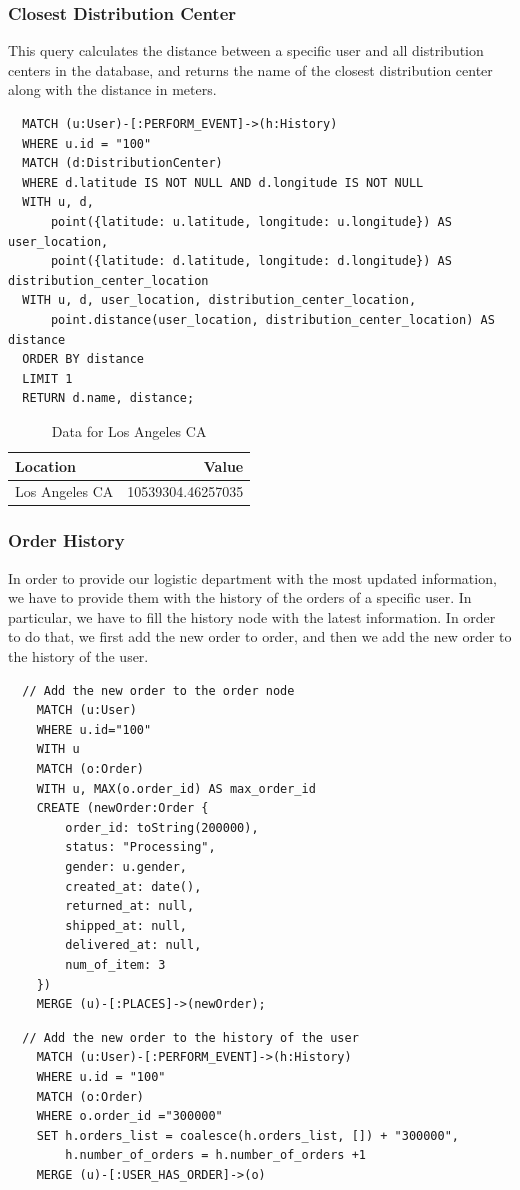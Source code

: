 \documentclass[a4paper,12pt]{article}
\begin{document}
\subsubsection{Closest Distribution Center}
This query calculates the distance between a specific user and all distribution centers in the database, and returns the name of the closest distribution center along with the distance in meters.
\begin{verbatim}
  MATCH (u:User)-[:PERFORM_EVENT]->(h:History)
  WHERE u.id = "100"
  MATCH (d:DistributionCenter)
  WHERE d.latitude IS NOT NULL AND d.longitude IS NOT NULL
  WITH u, d, 
      point({latitude: u.latitude, longitude: u.longitude}) AS user_location, 
      point({latitude: d.latitude, longitude: d.longitude}) AS distribution_center_location
  WITH u, d, user_location, distribution_center_location, 
      point.distance(user_location, distribution_center_location) AS distance
  ORDER BY distance
  LIMIT 1
  RETURN d.name, distance;
\end{verbatim}

\begin{table}[h!]
  \centering
  \caption{Data for Los Angeles CA}
  \label{tab:los_angeles_data}
  \begin{tabular}{l r}
      \toprule
      \textbf{Location} & \textbf{Value} \\
      \midrule
      Los Angeles CA & 10539304.46257035 \\
      \bottomrule
  \end{tabular}
\end{table}

\subsubsection{Order History}
In order to provide our logistic department with the most updated information, we have to provide them with the history of the orders of a specific user.
In particular, we have to fill the history node with the latest information. In order to do that, we first add the new order to order, and then we add the new order to the history of the user.
\begin{verbatim}
  // Add the new order to the order node
    MATCH (u:User)
    WHERE u.id="100"
    WITH u
    MATCH (o:Order)
    WITH u, MAX(o.order_id) AS max_order_id
    CREATE (newOrder:Order { 
        order_id: toString(200000), 
        status: "Processing",
        gender: u.gender,
        created_at: date(),
        returned_at: null,
        shipped_at: null,
        delivered_at: null,
        num_of_item: 3
    })
    MERGE (u)-[:PLACES]->(newOrder);
\end{verbatim}
\begin{verbatim}
  // Add the new order to the history of the user
    MATCH (u:User)-[:PERFORM_EVENT]->(h:History)
    WHERE u.id = "100"
    MATCH (o:Order)
    WHERE o.order_id ="300000"
    SET h.orders_list = coalesce(h.orders_list, []) + "300000",
        h.number_of_orders = h.number_of_orders +1
    MERGE (u)-[:USER_HAS_ORDER]->(o)
\end{verbatim}
\end{document}
